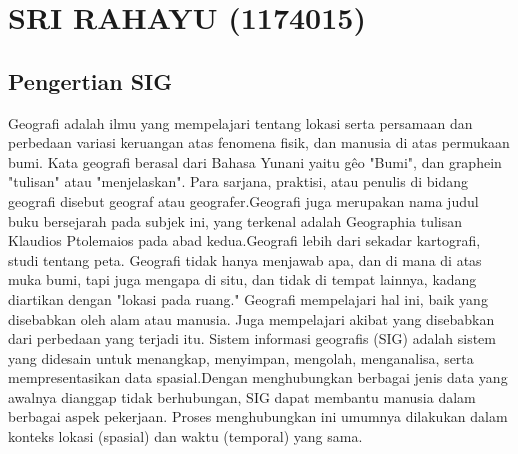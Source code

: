 \section{SRI RAHAYU (1174015)}
\subsection{Pengertian SIG}
Geografi adalah ilmu yang mempelajari tentang lokasi serta persamaan dan perbedaan variasi keruangan atas fenomena fisik, dan manusia di atas permukaan bumi. Kata geografi berasal dari Bahasa Yunani yaitu gêo "Bumi", dan graphein "tulisan" atau "menjelaskan". Para sarjana, praktisi, atau penulis di bidang geografi disebut geograf atau geografer.Geografi juga merupakan nama judul buku bersejarah pada subjek ini, yang terkenal adalah Geographia tulisan Klaudios Ptolemaios pada abad kedua.Geografi lebih dari sekadar kartografi, studi tentang peta. Geografi tidak hanya menjawab apa, dan di mana di atas muka bumi, tapi juga mengapa di situ, dan tidak di tempat lainnya, kadang diartikan dengan "lokasi pada ruang." Geografi mempelajari hal ini, baik yang disebabkan oleh alam atau manusia. Juga mempelajari akibat yang disebabkan dari perbedaan yang terjadi itu.
Sistem informasi geografis (SIG) adalah sistem yang didesain untuk menangkap, menyimpan, mengolah, menganalisa, serta mempresentasikan data spasial.Dengan menghubungkan berbagai jenis data yang awalnya dianggap tidak berhubungan, SIG dapat membantu manusia dalam berbagai aspek pekerjaan. Proses menghubungkan ini umumnya dilakukan dalam konteks lokasi (spasial) dan waktu (temporal) yang sama.

